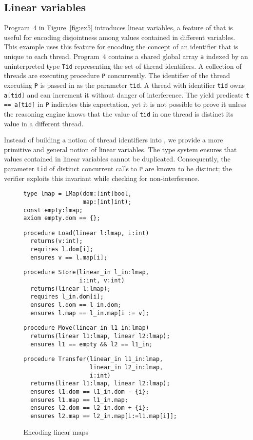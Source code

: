\subsection{Linear variables}

Program~4 in Figure~\ref{fig:ex5} introduces linear variables, a feature of \civl 
that is useful for encoding disjointness among values contained in 
different variables.  
This example uses this feature for encoding the concept of an identifier 
that is unique to each thread.
Program~4 contains a shared global array {\tt a} indexed by an uninterpreted type {\tt Tid} 
representing the set of thread identifiers.
A collection of threads are executing procedure {\tt P} concurrently.
The identifier of the thread executing {\tt P} is passed in as the parameter {\tt tid}.
A thread with identifier {\tt tid} owns {\tt a[tid]} and can increment it without danger of interference.
The yield predicate {\tt t == a[tid]} in {\tt P} indicates this expectation, yet it is not possible to prove it 
unless the reasoning engine knows that the value of {\tt tid} in one thread is distinct 
its value in a different thread.

Instead of building a notion of thread identifiers into \civl, we provide a more 
primitive and general notion of linear variables.
The \civl type system ensures that values contained in linear variables cannot be duplicated.
Consequently, the parameter {\tt tid} of distinct concurrent calls to {\tt P} are known to be distinct;
the \civl verifier exploits this invariant while checking for non-interference.

\begin{figure}
\begin{verbatim}
type lmap = LMap(dom:[int]bool,
                 map:[int]int);
const empty:lmap;
axiom empty.dom == {};
\end{verbatim}
\begin{verbatim}
procedure Load(linear l:lmap, i:int) 
  returns(v:int);
  requires l.dom[i];
  ensures v == l.map[i];
\end{verbatim}
\begin{verbatim}
procedure Store(linear_in l_in:lmap,
                i:int, v:int) 
  returns(linear l:lmap);
  requires l_in.dom[i];
  ensures l.dom == l_in.dom;
  ensures l.map == l_in.map[i := v];
\end{verbatim}
\begin{verbatim}
procedure Move(linear_in l1_in:lmap) 
  returns(linear l1:lmap, linear l2:lmap);
  ensures l1 == empty && l2 == l1_in;
\end{verbatim}
\begin{verbatim}
procedure Transfer(linear_in l1_in:lmap, 
                   linear_in l2_in:lmap,
                   i:int) 
  returns(linear l1:lmap, linear l2:lmap);
  ensures l1.dom == l1_in.dom - {i};
  ensures l1.map == l1_in.map;
  ensures l2.dom == l2_in.dom + {i};
  ensures l2.map == l2_in.map[i:=l1.map[i]];
\end{verbatim}
\caption{Encoding linear maps}
\label{fig:linear-maps}
\end{figure}

